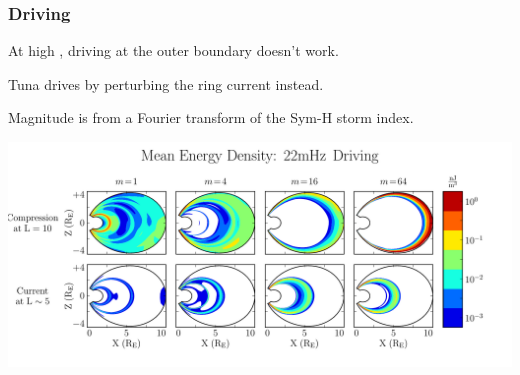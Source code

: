\documentclass{beamer}
\begin{document}
\begin{frame}
\frametitle{Driving}

\begin{wideitemize}
\item At high \azm, driving at the outer boundary doesn't work. 
\item Tuna drives by perturbing the ring current instead. 
\item Magnitude is from a Fourier transform of the Sym-H storm index. 
\end{wideitemize}

\vfill

\includegraphics[width=\textwidth]{figures/drivers.pdf}%

\end{frame}

\end{document}

